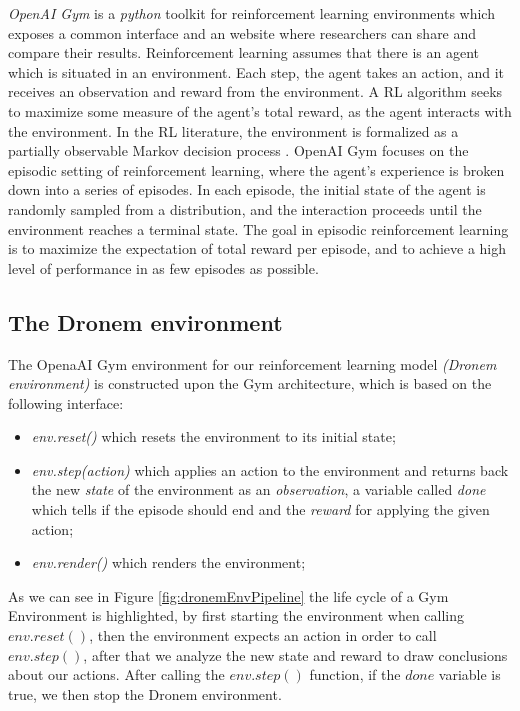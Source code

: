  \emph{OpenAI Gym} \cite{brockman2016openai} is a \emph{python} toolkit for reinforcement learning environments which exposes a common interface and an website where researchers can share and compare their results. Reinforcement learning assumes that there is an agent which is situated in an environment. Each step, the agent takes an action, and it receives an observation and reward from the environment. A RL algorithm seeks to maximize some measure of the agent’s total reward, as the agent interacts with the environment. In the RL literature, the environment is formalized as a partially observable Markov decision process \cite{rsab}. OpenAI Gym focuses on the episodic setting of reinforcement learning, where the agent’s experience is broken down into a series of episodes. In each episode, the initial state of the agent is randomly sampled from a distribution, and the interaction proceeds until the environment reaches a terminal state. The goal in episodic reinforcement learning is to maximize the expectation of total reward per episode, and to achieve a high level of performance in as few episodes as possible.


\subsection{The Dronem environment}\label{gymInterface}

The OpenaAI Gym environment for our reinforcement learning model \emph{(Dronem environment)} is constructed upon  the Gym architecture\cite{brockman2016openai}, which is based on the following interface:
\begin{itemize}
  \item \textit{env.reset()} which resets the environment to its initial state;
  \item \textit{env.step(action)} which applies an action to the environment and returns back the new \emph{state} of the environment as an \emph{observation}, a variable called \emph{done} which tells if the episode should end and the \emph{reward} for applying the given action;
  \item \textit{env.render()} which renders the environment;
\end{itemize}


\par As we can see in Figure \ref{fig:dronemEnvPipeline} the life cycle of a Gym Environment is highlighted, by first starting the environment when calling $env.reset()$, then the environment expects an action in order to call $env.step()$, after that we analyze the new state and reward to draw conclusions about our actions. After calling the $env.step()$ function, if the $done$ variable is true, we then stop the Dronem environment.


